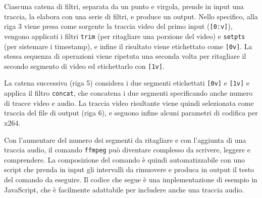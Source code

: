 Ciascuna catena di filtri, separata da un punto e virgola, prende in input una traccia, la elabora con una serie di filtri, e produce un output. Nello specifico, alla riga 3 viene presa come sorgente la traccia video del primo input (\texttt{[0:v]}), vengono applicati i filtri \texttt{trim} (per ritagliare una porzione del video) e \texttt{setpts} (per sistemare i timestamp\footnotemark{}), e infine il risultato viene etichettato come \texttt{[0v]}. La stessa sequenza di operazioni viene ripetuta una seconda volta per ritagliare il secondo segmento di video ed etichettarlo con \texttt{[1v]}.

La catena successiva (riga 5) considera i due segmenti etichettati \texttt{[0v]} e \texttt{[1v]} e applica il filtro \texttt{concat}, che concatena i due segmenti specificando anche numero di tracce video e audio. La traccia video risultante viene quindi selezionata come traccia del file di output (riga 6), e seguono infine alcuni parametri di codifica per x264.\cite{ozer}



Con l'aumentare del numero dei segmenti da ritagliare e con l'aggiunta di una traccia audio, il comando \texttt{ffmpeg} può diventare complesso da scrivere, leggere e comprendere. La composizione del comando è quindi automatizzabile con uno script che prenda in input gli intervalli da rimuovere e produca in output il testo del comando da eseguire. Il codice che segue è una implementazione di esempio in JavaScript, che è facilmente adattabile per includere anche una traccia audio.

